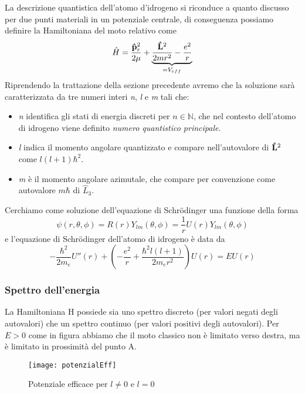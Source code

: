 La descrizione quantistica dell'atomo d'idrogeno si riconduce a quanto discusso per due punti materiali in un potenziale centrale, di conseguenza possiamo definire la Hamiltoniana del moto relativo come 
\begin{equation*}
	\hat{H} = \frac{\bold{\hat{p}}_{r}^2}{2 \mu} + \underbrace{\frac{\bold{\hat{L}}^2}{2mr^2} - \frac{e^2}{r}}_{= V_{eff}}
\end{equation*}
Riprendendo la trattazione della sezione precedente avremo che la soluzione sar\`a caratterizzata da tre numeri interi \textit{n}, \textit{l} e \textit{m} tali che:
\begin{itemize}
	\item \textit{n} identifica gli stati di energia discreti per $n \in \mathbb{N}$, che nel contesto dell'atomo di idrogeno viene definito \textit{numero quantistico principale}.
	\item \textit{l} indica il momento angolare quantizzato e compare nell'autovalore di $\bold{\hat{L}}^2$ come $l(l+1)\hbar^2$.
	\item \textit{m} \`e il momento angolare azimutale, che compare per convenzione come autovalore $m\hbar$ di $\hat{L}_3$.
\end{itemize}
Cerchiamo come soluzione dell'equazione di Schr\"odinger una funzione della forma 
\begin{equation*}
	\psi(r, \theta, \phi) = R(r)Y_{lm}(\theta,\phi) = \frac{1}{r}U(r)Y_{lm}(\theta,\phi)
\end{equation*}
e l'equazione di Schr\"odinger dell'atomo di idrogeno \`e data da 
\begin{equation}
	-\frac{\hbar^2}{2m_e}U''(r) + \left ( -\frac{e^2}{r} + \frac{\hbar^2l(l+1)}{2m_er^2}\right)U(r) = EU(r)
\end{equation}

\subsubsection{Spettro dell'energia }
La Hamiltoniana H possiede sia uno spettro discreto (per valori negati degli autovalori) che un spettro continuo (per valori positivi degli autovalori). Per $E > 0 $ come in figura abbiamo che il moto classico non \`e limitato verso destra, ma \`e limitato in prossimit\`a del punto A.

\begin{wrapfigure}{r}{0.5\textwidth} %
    \centering
    \texttt{[image: potenzialEff]}
    \caption{Potenziale efficace per $l \neq 0$ e $l = 0$}
\end{wrapfigure}

